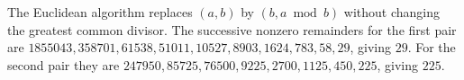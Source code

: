 The Euclidean algorithm replaces $(a,b)$ by $(b,a\bmod b)$ without changing the greatest common divisor. The successive nonzero remainders for the first pair are $ 1855043,358701,61538,51011,10527,8903,1624,783,58,29 $, giving $\boxed{29}$. For the second pair they are $ 247950,85725,76500,9225,2700,1125,450,225 $, giving $\boxed{225}$.

